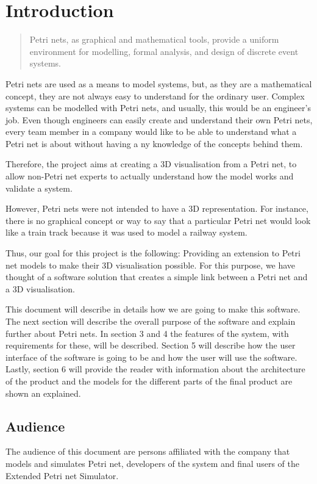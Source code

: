 \section{Introduction}

\begin{quotation}
Petri nets, as graphical and mathematical tools, provide a uniform environment for modelling, formal analysis, and design of discrete event systems. \cite{Zurawski:1994}
\end{quotation}

Petri nets are used as a means to model systems, but, as they are a mathematical concept, they are not always easy to understand for the ordinary user. Complex systems can be modelled with Petri nets, and usually, this would be an engineer's job. Even though engineers can easily create and understand their own Petri nets, every team member in a company would like to be able to understand what a Petri net is about without having a
ny knowledge of the concepts behind them.

Therefore, the project aims at creating a 3D visualisation from a Petri net, to allow non-Petri net experts to actually understand how the model works and validate a system.

However, Petri nets were not intended to have a 3D representation. For instance, there is no graphical concept or way to say that a particular Petri net would look like a train track because it was used to model a railway system. 

Thus, our goal for this project is the following: Providing an extension to Petri net models to make their 3D visualisation possible. For this purpose, we have thought of a software solution that creates a simple link between a Petri net and a 3D visualisation.

This document will describe in details how we are going to make this software. The next section will describe the overall purpose of the software and explain further about Petri nets. In section 3 and 4 the features of the system, with requirements for these, will be described. Section 5 will describe how the user interface of the software is going to be and how the user will use the software. Lastly, section 6 will provide the reader with information about the architecture of the product and the models for the different parts of the final product are shown an explained. 

\subsection{Audience}

The audience of this document are persons affiliated with the company that models and simulates Petri net, developers of the system and final users of the Extended Petri net Simulator.